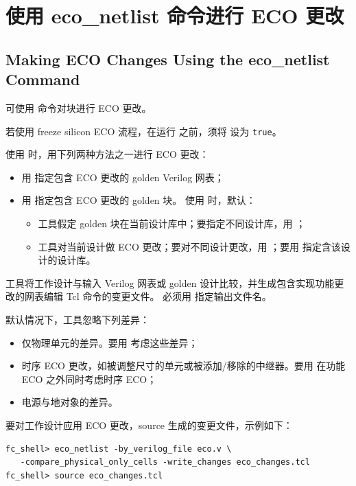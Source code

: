 \section{使用 eco\_netlist 命令进行 ECO 更改}
\subsection*{Making ECO Changes Using the eco\_netlist Command}

可使用  命令对块进行 ECO 更改。

若使用 freeze silicon ECO 流程，在运行  之前，须将  设为 \texttt{true}。

使用  时，用下列两种方法之一进行 ECO 更改：
\begin{itemize}
  \item 用  指定包含 ECO 更改的 golden Verilog 网表；
  \item 用  指定包含 ECO 更改的 golden 块。
  使用  时，默认：
  \begin{itemize}
    \item 工具假定 golden 块在当前设计库中；要指定不同设计库，用 ；
    \item 工具对当前设计做 ECO 更改；要对不同设计更改，用 ；要用  指定含该设计的设计库。
  \end{itemize}
\end{itemize}

工具将工作设计与输入 Verilog 网表或 golden 设计比较，并生成包含实现功能更改的网表编辑 Tcl 命令的变更文件。
必须用  指定输出文件名。

默认情况下，工具忽略下列差异：
\begin{itemize}
  \item 仅物理单元的差异。要用  考虑这些差异；
  \item 时序 ECO 更改，如被调整尺寸的单元或被添加/移除的中继器。要用  在功能 ECO 之外同时考虑时序 ECO；
  \item 电源与地对象的差异。
\end{itemize}

要对工作设计应用 ECO 更改，source  生成的变更文件，示例如下：
\begin{lstlisting}
fc_shell> eco_netlist -by_verilog_file eco.v \
   -compare_physical_only_cells -write_changes eco_changes.tcl
fc_shell> source eco_changes.tcl
\end{lstlisting}

